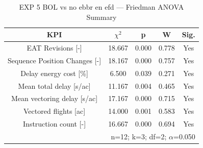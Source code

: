 \begin{table}[!t]
\caption{EXP 5 BOL vs no ebbr en efd — Friedman ANOVA Summary}
\begin{center}
\footnotesize
\setlength{\tabcolsep}{3pt}
\renewcommand{\arraystretch}{1.000}
\begin{tabular}{|c|c|c|c|c|}
\hline
\textbf{KPI} & \textbf{$\chi^2$} & \textbf{p} & \textbf{W} & \textbf{Sig.} \\
\hline
EAT Revisions [-] & 18.667 & 0.000 & 0.778 & Yes \\
\hline
Sequence Position Changes [-] & 18.167 & 0.000 & 0.757 & Yes \\
\hline
Delay energy cost [\%] & 6.500 & 0.039 & 0.271 & Yes \\
\hline
Mean total delay [s/ac] & 11.167 & 0.004 & 0.465 & Yes \\
\hline
Mean vectoring delay [s/ac] & 17.167 & 0.000 & 0.715 & Yes \\
\hline
Vectored flights [ac] & 14.000 & 0.001 & 0.583 & Yes \\
\hline
Instruction count [-] & 16.667 & 0.000 & 0.694 & Yes \\
\hline
\multicolumn{5}{r}{n=12; k=3; df=2; $\alpha$=0.050}\\
\end{tabular}
\label{tab:exp\_5\_bol\_vs\_no\_ebbr\_en\_efd\_friedman}
\end{center}
\end{table}